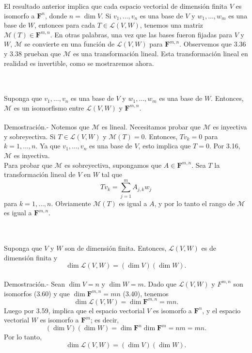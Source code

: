 El resultado anterior implica que cada espacio vectorial de dimensión finita $V$ es isomorfo a $\textbf{F}^n$, donde $n=\dim V$. Si $v_1,\ldots,v_n$ es una base de $V$ y $w_1,\ldots,w_m$ es una base de $W$, entonces para cada $T\in \mathcal{L}(V,W)$, tenemos una matriz $\mathcal{M}(T)\in \textbf{F}^{m,n}$. En otras palabras, una vez que las bases fueron fijadas para $V$ y $W$, $\mathcal{M}$ se convierte en una función de $\mathcal{L}(V,W)$ para $\textbf{F}^{m,n}$. Observemos que $3.36$ y $3.38$ prueban que $\mathcal{M}$ es una transformación lineal. Esta transformación lineal en realidad es invertible, como se mostraremos ahora.

\begin{myteo}\,\\\\
    Suponga que $v_1,\ldots,v_n$ es una base de $V$ y $w_1,\ldots,w_m$ es una base de $W$. Entonces, $\mathcal{M}$ es un isomorfismo entre $\mathcal{L}(V,W)$ y $\textbf{F}^{m,n}$.\\\\
    Demostración.-\; Notemos que $\mathcal{M}$ es lineal. Necesitamos probar que $\mathcal{M}$ es inyectiva y sobreyectiva. Si $T\in \mathcal{L}(V,W)$ y $\mathcal{M}(T)=0$. Entonces, $Tv_k=0$ para $k=1,\ldots,n$. Ya que $v_1,\ldots,v_n$ es una base de $V$, esto implica que $T=0$. Por 3.16, $\mathcal{M}$ es inyectiva.\\
    Para probar que $\mathcal{M}$ es sobreyectiva, supongamos que $A\in \textbf{F}^{m,n}$. Sea $T$ la transformación lineal de $V$ en $W$ tal que
    $$Tv_k=\sum_{j=1}^m A_{j,k}w_j$$
    para $k=1,\ldots,n$. Obviamente $\mathcal{M}(T)$ es igual a $A$, y por lo tanto el rango  de $\mathcal{M}$ es igual a $\textbf{F}^{m,n}$.
\end{myteo}

\begin{myteo}[\boldmath$\dim(V,W)=(\dim V)(\dim W)$]\,\\\\
    Suponga que $V$ y $W$ son de dimensión finita. Entonces, $\mathcal{L}(V,W)$ es de dimensión finita y
    $$\dim\mathcal{L}(V,W)=(\dim V)(\dim W).$$\\
    Demostración.-\; Sean $\dim V = n$ y $\dim W=m$. Dado que $\mathcal{L}(V,W)$ y $F^{m,n}$ son isomorfos (3.60) y que $\dim\textbf{F}^{m,n}=mn$ (3.40), tenemos 
	$$\dim\mathcal{L}(V,W)=\dim\textbf{F}^{m,n}=mn.$$
	Luego por 3.59, implica que el espacio vectorial $V$ es isomorfo a $\textbf{F}^n$, y el espacio vectorial $W$ es isomorfo a $\textbf{F}^m$; es decir,
	$$(\dim V)(\dim W) = \dim\textbf{F}^n \dim\textbf{F}^m=nm=mn.$$
	Por lo tanto,
	$$\dim\mathcal{L}(V,W)=(\dim V)(\dim W).$$
\end{myteo}

